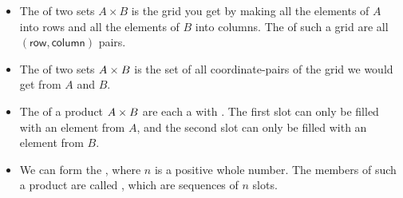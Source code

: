 \documentclass[../../../main.tex]{subfiles}
\begin{document}
\begin{itemize}

  \item The  of two sets $A \times B$ is the grid you get by making all the elements of $A$ into rows and all the elements of $B$ into columns. The  of such a grid are all $(\textsf{row}, \textsf{column})$ pairs.

  \item The  of two sets $A \times B$ is the set of all coordinate-pairs of the grid we would get from $A$ and $B$.
  
  \item The  of a product $A \times B$ are each a  with . The first slot can only be filled with an element from $A$, and the second slot can only be filled with an element from $B$.
  
  \item We can form the , where $n$ is a positive whole number. The members of such a product are called , which are sequences of $n$ slots. 

\end{itemize}
\end{document}
